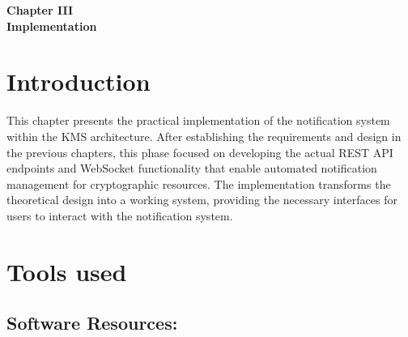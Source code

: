 
\vspace*{9cm}
\begin{doublespace}
    \centering
    \textbf{ \huge Chapter III \\ [1 cm] Implementation}
\end{doublespace} 

\newpage
\fancyhead[R]{\rightmark}

\setcounter{section}{0}
\section*{Introduction}

This chapter presents the practical implementation of the notification system within the KMS architecture. After establishing the requirements and design in the previous chapters, this phase focused on developing the actual REST API endpoints and WebSocket functionality that enable automated notification management for cryptographic resources. The implementation transforms the theoretical design into a working system, providing the necessary interfaces for users to interact with the notification system.

\section{Tools used}

\subsection{Software Resources:}

\vspace{0.5cm}

